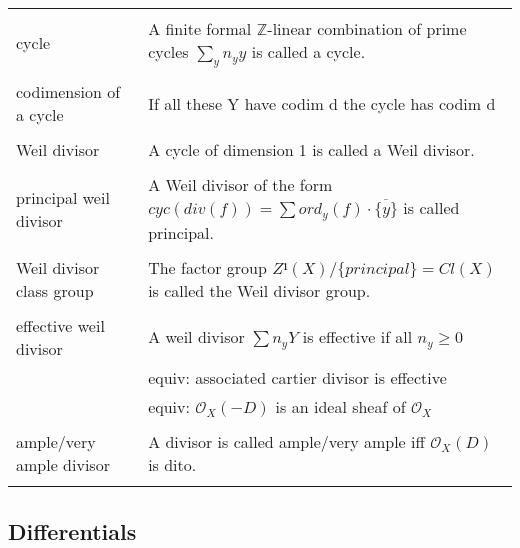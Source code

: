 \documentclass[a4paper, 12pt]{article}
\newcommand{\ox}{\mathcal{O}_X}
\begin{document}
\begin{longtable}{p{}  p{} }
    &\\

    cycle & A finite formal $\mathbb{Z}$-linear combination of prime cycles $\sum_y n_y y$ is called a cycle.\\

    &\\

    codimension of a cycle & If all these Y have codim d the cycle has codim d\\

    &\\

    Weil divisor & A cycle of dimension 1 is called a Weil divisor.\\

    &\\
    
  



	principal weil divisor & A Weil divisor of the form $cyc(div(f)) = \sum ord_y(f)\cdot\overline{\{y\}}$ is called principal.\\
	
	&\\
	
	Weil divisor class group& The factor group $Z¹(X)/\{principal\} = Cl(X)$ is called the Weil divisor group. \\

	&\\

	effective weil divisor& A weil divisor $\sum n_y Y$ is effective if all $n_y \geq 0$\\
	& equiv: associated cartier divisor is effective\\
	& equiv: $\ox(-D)$ is an ideal sheaf of $\ox$\\
	
	&\\
	
	ample/very ample divisor & A divisor is called ample/very ample iff $\ox(D)$ is dito.\\
	
	&\\
	
		
\end{longtable}


\subsection{Differentials}
\end{document}
